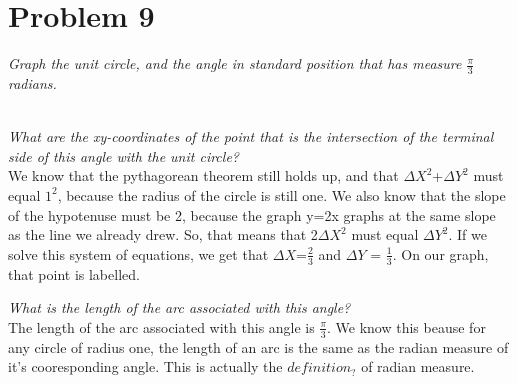 \documentclass[11pt]{article} %
\newcommand\tab[1][1cm]{\hspace*{#1}}
\begin{document}
\section{Problem 9}
\textit{Graph the unit circle, and the angle in standard position that has measure $\frac{\pi}{3}$ radians.} \\
\\
\textit{What are the xy-coordinates of the point that is the intersection of the terminal side of this angle with the unit circle?} \\
\tab We know that the pythagorean theorem still holds up, and that $\Delta X^2$+$\Delta Y^2$ must equal $1^2$, because the radius of the circle is still one. We also know that the slope of the hypotenuse must be 2, because the graph y=2x graphs at the same slope as the line we already drew. So, that means that 2$\Delta X^2$ must equal $\Delta Y^2$. If we solve this system of equations, we get that $\Delta X$=$\frac{2}{3}$ and $\Delta Y$ = $\frac{1}{3}$. On our graph, that point is labelled. 


\textit{What is the length of the arc associated with this angle?} \\
\tab The length of the arc associated with this angle is $\frac{\pi}{3}$. We know this beause for any circle of radius one, the length of an arc is the same as the radian measure of it's cooresponding angle. 
This is actually the $definition_?$ of radian measure.
\end{document}

